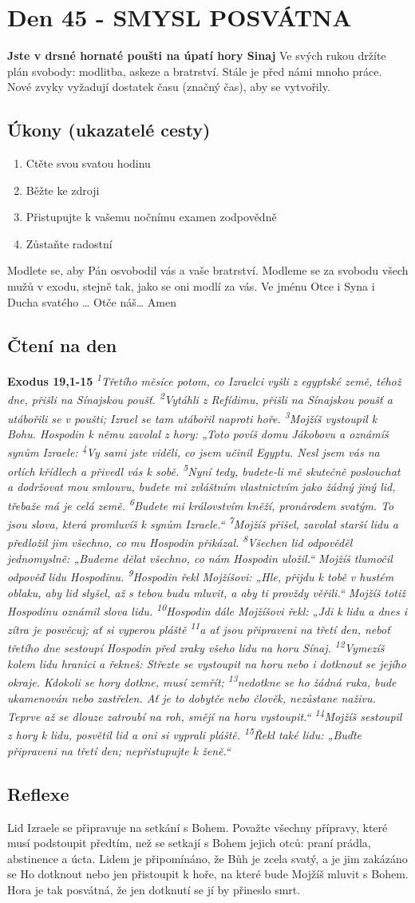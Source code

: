 \documentclass[11pt]{article}
\newcommand{\zacatekSedmyTyden}{
  \textbf{Jste v drsné hornaté poušti na úpatí hory Sinaj} \newline 
  Ve svých rukou držíte plán svobody: modlitba, askeze a bratrství. Stále je před námi mnoho práce. Nové zvyky vyžadují dostatek času (značný čas), aby se vytvořily.

  \subsection*{Úkony (ukazatelé cesty)}
\begin{enumerate}
  \item Ctěte svou svatou hodinu
  \item Běžte ke zdroji
  \item Přistupujte k vašemu nočnímu examen zodpovědně
  \item Zůstaňte radostní
\end{enumerate}
Modlete se, aby Pán osvobodil vás a vaše bratrství. \newline
Modleme se za svobodu všech mužů v exodu, stejně tak, jako se oni modlí za vás.\newline
Ve jménu Otce i Syna i Ducha svatého …  Otče náš… Amen
}
\begin{document}
\newpage
\section{Den 45 - SMYSL POSVÁTNA}
\zacatekSedmyTyden
\subsection*{Čtení na den}
\textbf{Exodus 19,1-15}
\newline
\textit{
\textsuperscript{1}Třetího měsíce potom, co Izraelci vyšli z egyptské země, téhož dne, přišli na Sínajskou poušť.
\textsuperscript{2}Vytáhli z Refídimu, přišli na Sínajskou poušť a utábořili se v poušti; Izrael se tam utábořil naproti hoře.
\textsuperscript{3}Mojžíš vystoupil k Bohu. Hospodin k němu zavolal z hory: „Toto povíš domu Jákobovu a oznámíš synům Izraele:
\textsuperscript{4}Vy sami jste viděli, co jsem učinil Egyptu. Nesl jsem vás na orlích křídlech a přivedl vás k sobě.
\textsuperscript{5}Nyní tedy, budete-li mě skutečně poslouchat a dodržovat mou smlouvu, budete mi zvláštním vlastnictvím jako žádný jiný lid, třebaže má je celá země.
\textsuperscript{6}Budete mi královstvím kněží, pronárodem svatým. To jsou slova, která promluvíš k synům Izraele.“
\textsuperscript{7}Mojžíš přišel, zavolal starší lidu a předložil jim všechno, co mu Hospodin přikázal.
\textsuperscript{8}Všechen lid odpověděl jednomyslně: „Budeme dělat všechno, co nám Hospodin uložil.“ Mojžíš tlumočil odpověď lidu Hospodinu.
\textsuperscript{9}Hospodin řekl Mojžíšovi: „Hle, přijdu k tobě v hustém oblaku, aby lid slyšel, až s tebou budu mluvit, a aby ti provždy věřili.“ Mojžíš totiž Hospodinu oznámil slova lidu.
\textsuperscript{10}Hospodin dále Mojžíšovi řekl: „Jdi k lidu a dnes i zítra je posvěcuj; ať si vyperou pláště
\textsuperscript{11}a ať jsou připraveni na třetí den, neboť třetího dne sestoupí Hospodin před zraky všeho lidu na horu Sínaj.
\textsuperscript{12}Vymezíš kolem lidu hranici a řekneš: Střezte se vystoupit na horu nebo i dotknout se jejího okraje. Kdokoli se hory dotkne, musí zemřít;
\textsuperscript{13}nedotkne se ho žádná ruka, bude ukamenován nebo zastřelen. Ať je to dobytče nebo člověk, nezůstane naživu. Teprve až se dlouze zatroubí na roh, smějí na horu vystoupit.“
\textsuperscript{14}Mojžíš sestoupil z hory k lidu, posvětil lid a oni si vyprali pláště.
\textsuperscript{15}Řekl také lidu: „Buďte připraveni na třetí den; nepřistupujte k ženě.“
}

\subsection*{Reflexe}
Lid Izraele se připravuje na setkání s Bohem. Považte všechny přípravy, které musí podstoupit předtím, než se setkají
s Bohem jejich otců: praní prádla, abstinence a úcta. Lidem je připomínáno, že Bůh je zcela svatý, a je jim zakázáno se
Ho dotknout nebo jen přistoupit k hoře, na které bude Mojžíš mluvit s Bohem. Hora je tak posvátná, že jen dotknutí se
jí by přineslo smrt.
\end{document}
